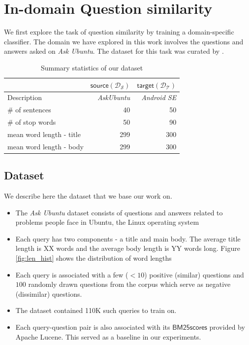\documentclass{sigkddExp}
\begin{document}
\section{In-domain Question similarity}
\label{in_domain}
We first explore the task of question similarity by training a domain-specific classifier. The domain we have explored in this work involves the questions and answers asked on \textit{Ask Ubuntu}. The dataset for this task was curated by \cite{lei2015semi}. 

\begin{table}[h]
\begin{tabular}{l|r|r}
     
     & $\mathsf{source} (\mathcal{D_S})$
     & $\mathsf{target} (\mathcal{D_T})$
     \\
     \toprule
     Description
     & \textit{AskUbuntu}
     & \textit{Android SE}
     \\
     \# of sentences
     & 40
     & 50
     \\
     \# of stop words 
     & 50
     & 90
     \\
     mean word length - title
     & 299
     & 300
     \\
     mean word length - body
     & 299
     & 300
\end{tabular}
\caption{Summary statistics of our dataset}
\label{tab:dataset}
\end{table}

\subsection{Dataset}
We describe here the dataset that we base our work on.
\begin{itemize}[topsep=0pt,itemsep=-1ex,partopsep=1ex,parsep=1ex]
\item The \textit{Ask Ubuntu} dataset consists of questions and answers related to problems people face in Ubuntu, the Linux operating system
\item Each query has two components - a title and main body. The average title length is {\color{red} XX} words and the average body length is {\color{red} YY words} long. Figure \ref{fig:len_hist} shows the distribution of word lengths
\item Each query is associated with a few ($<10$) positive (similar) questions and $100$ randomly drawn questions from the corpus which serve as negative (dissimilar) questions.
\item The dataset contained 110K such queries to train on.
\item Each query-question pair is also associated with its $\mathsf{BM25 scores}$ provided by Apache Lucene. This served as a baseline in our experiments.
\end{itemize}
\end{document}
